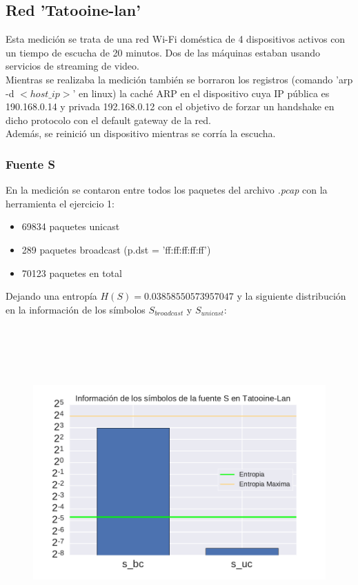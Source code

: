 \subsection{Red 'Tatooine-lan'}
Esta medición se trata de una red Wi-Fi doméstica de 4 dispositivos activos con un tiempo de escucha de 20 minutos. Dos de las máquinas estaban usando servicios de streaming de video.
\\

Mientras se realizaba la medición también se borraron los registros (comando 'arp -d $<host\_ip>$' en linux) la caché ARP en el dispositivo cuya IP pública es 190.168.0.14 y privada 192.168.0.12 con el objetivo de forzar un handshake en dicho protocolo con el default gateway de la red.
\\

Además, se reinició un dispositivo mientras se corría la escucha.

\subsubsection{Fuente S}
En la medición se contaron entre todos los paquetes del archivo \emph{.pcap} con la herramienta el ejercicio 1:

        \begin{itemize}
            \item 69834 paquetes unicast
            \item 289 paquetes broadcast (p.dst = 'ff:ff:ff:ff:ff')
            \item 70123 paquetes en total
        \end{itemize}

Dejando una entropía $H(S) = 0.03858550573957047$ y la siguiente distribución en la información de los símbolos $S_{broadcast}$ y $S_{unicast}$:

\begin{figure}[H]
	\includegraphics[width=15cm, height=12cm, keepaspectratio]{../img/barras-Tatooine-Lan.pdf}
\end{figure}


